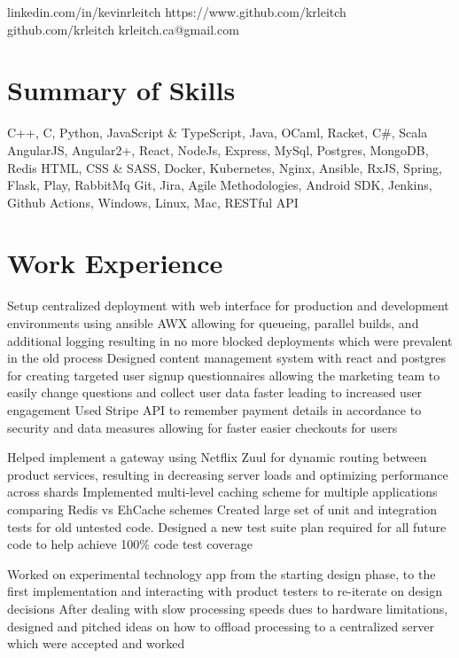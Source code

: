 \documentclass{my_resume}
\begin{document}
        {linkedin.com/in/kevinrleitch}
        {https://www.github.com/krleitch}
        {github.com/krleitch}
        {krleitch.ca@gmail.com}

\section{Summary of Skills}
{C++, C, Python, JavaScript \& TypeScript, Java, OCaml, Racket, C\#, Scala}
{AngularJS, Angular2+, React, NodeJs, Express, MySql, Postgres, MongoDB, Redis HTML,
 CSS \& SASS, Docker, Kubernetes, Nginx, Ansible, RxJS, Spring, Flask, Play, RabbitMq}
{Git, Jira, Agile Methodologies, Android SDK, Jenkins, Github Actions, Windows, Linux, Mac, RESTful API}

\section{Work Experience}

\workitemsthree
{Setup centralized deployment with web interface for production and development environments using ansible AWX allowing for queueing,
 parallel builds, and additional logging resulting in no more blocked deployments which were prevalent in the old process}
{Designed content management system with react and postgres for creating targeted user signup questionnaires allowing the marketing team
 to easily change questions and collect user data faster leading to increased user engagement}
{Used Stripe API to remember payment details in accordance to security and data measures allowing for faster easier checkouts for users}

\workitemsthree
{Helped implement a gateway using Netflix Zuul for dynamic routing between product services,
 resulting in decreasing server loads and optimizing performance across shards}
{Implemented multi-level caching scheme for multiple applications comparing Redis vs EhCache schemes}
{Created large set of unit and integration tests for old untested code.
 Designed a new test suite plan required for all future code to help achieve 100\% code test coverage}

\workitemstwo
{Worked on experimental technology app from the starting design phase, to the first implementation and interacting
with product testers to re-iterate on design decisions}
{After dealing with slow processing speeds dues to hardware limitations, designed and pitched ideas on how to offload
processing to a centralized server which were accepted and worked }
\end{document}
